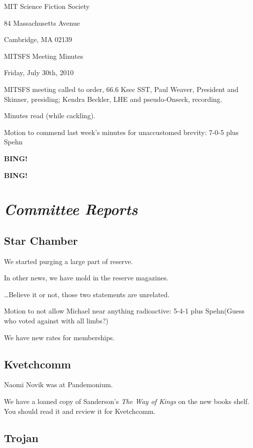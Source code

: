 \documentclass[10pt]{article}
\newcommand{\bing}{{\bf BING!} }
\newcommand{\goto}[1]{\bing \vskip 12pt \section*{{\em{#1}}}}
\newcommand{\ps}{ plus Spehn\xspace}
\newcommand{\skinner}{Paul Weaver, President and Skinner}
\newcommand{\onseck}{Kendra Beckler, LHE and pseudo-Onseck}
\newcommand{\meetingdate}{Friday, July 30th, 2010}
\begin{document}
\begin{center}

MIT Science Fiction Society

84 Massachusetts Avenue

Cambridge, MA 02139

\vspace{12pt}

MITSFS Meeting Minutes

\meetingdate

\end{center}

\vspace{18pt}

\setlength{\parskip}{6pt}

\noindent
MITSFS meeting called to order, 66.6 Ksec SST,
\skinner, presiding; \onseck, recording.

Minutes read (while cackling).

Motion to commend last week's minutes for unaccustomed brevity: 7-0-5 \ps

\bing

\goto{Committee Reports}

\subsection*{Star Chamber}

We started purging a large part of reserve.

In other news, we have mold in the reserve magazines.

\ldots Believe it or not, those two statements are unrelated.

Motion to not allow Michael near anything radioactive: 5-4-1 \ps (Guess who voted against with all limbs?)

We have new rates for memberships.

\subsection*{Kvetchcomm}

Naomi Novik was at Pandemonium.

We have a loaned copy of Sanderson's \textit{The Way of Kings} on the new books shelf.  You should read it and review it for Kvetchcomm.

\subsection*{Trojan}
\end{document}
